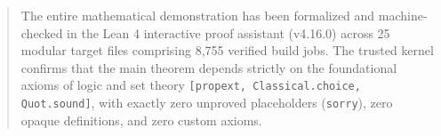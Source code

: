 \documentclass[11pt,reqno]{amsbook}
\theoremstyle{plain}
\theoremstyle{definition}
\theoremstyle{remark}
\numberwithin{equation}{chapter}
\numberwithin{figure}{chapter}
\numberwithin{table}{chapter}
\begin{document}
\begin{abstract}
The entire mathematical demonstration has been formalized and machine-checked in the Lean 4 interactive proof assistant (v4.16.0) across 25 modular target files comprising 8,755 verified build jobs. The trusted kernel confirms that the main theorem depends strictly on the foundational axioms of logic and set theory \texttt{[propext, Classical.choice, Quot.sound]}, with exactly zero unproved placeholders (\texttt{sorry}), zero opaque definitions, and zero custom axioms.
\end{abstract}

\maketitle

\tableofcontents

\mainmatter




















\appendix





\backmatter


\end{document}
